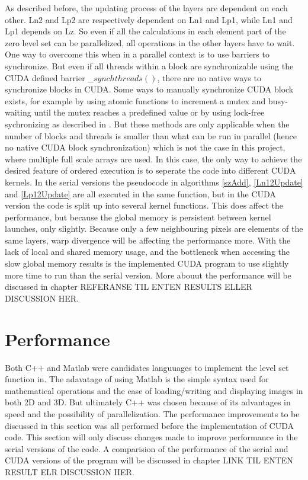 As described before, the updating process of the layers are dependent on each other. Ln2 and Lp2 are respectively dependent on Ln1 and Lp1, while Ln1 and Lp1 depends on Lz. So even if all the calculations in each element part of the zero level set can be parallelized, all operations in the other layers have to wait. One way to overcome this when in a parallel context is to use barriers to synchronize. But even if all threads within a block are synchronizable using the CUDA defined barrier $\_\_synchthreads()$, there are no native ways to synchronize blocks in CUDA. Some ways to manually synchronize CUDA block exists, for example by using atomic functions to increment a mutex and busy-waiting until the mutex reaches a predefined value or by using lock-free sychronizing as described in \cite{shucai10}. But these methods are only applicable when the number of blocks and threads is smaller than what can be run in parallel (hence no native CUDA block synchronization) which is not the case in this project, where multiple full scale arrays are used. In this case, the only way to achieve the desired feature of ordered execution is to seperate the code into different CUDA kernels. In the serial versions the pseudocode in algorithms \ref{szAdd}, \ref{Ln12Update} and \ref{Lp12Update} are all executed in the same function, but in the CUDA version the code is split up into several kernel functions. This does affect the performance, but because the global memory is persistent between kernel launches, only slightly. Because only a few neighbouring pixels are elements of the same layers, warp divergence will be affecting the performance more. With the lack of local and shared memory usage, and the bottleneck when accessing the slow global memory results is the implemented CUDA program to use slightly more time to run than the serial version. More abouut the performance will be discussed in chapter REFERANSE TIL ENTEN RESULTS ELLER DISCUSSION HER.

\section{Performance}
Both C++ and Matlab were candidates languuages to implement the level set function in. The adavatage of using Matlab is the simple syntax used for mathematical operations and the ease of loading/writing and displaying images in both 2D and 3D. But ultimately C++ was chosen because of its advantages in speed and the possibility of parallelization. The performance improvements to be discussed in this section was all performed before the implementation of CUDA code. This section will only discuss changes made to improve performance in the serial versions of the code. A comparision of the performance of the serial and CUDA versions of the program will be discussed in chapter LINK TIL ENTEN RESULT ELR DISCUSSION HER.

